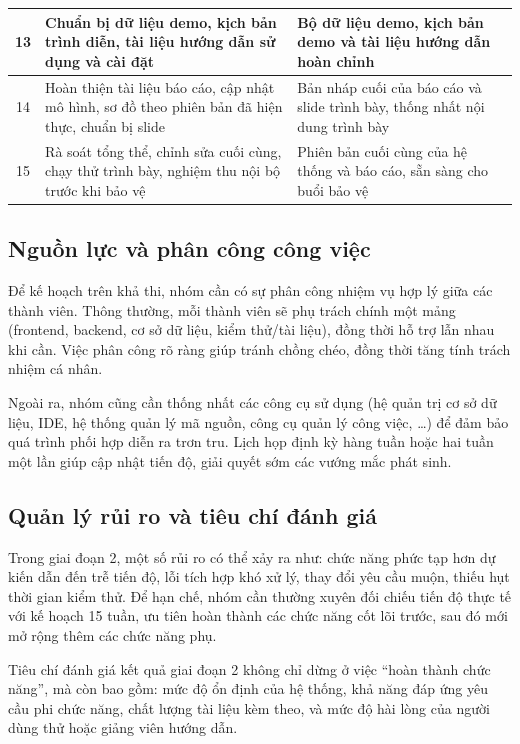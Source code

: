 \begin{center}
\begin{longtable}{|c|p{5cm}|p{4cm}|p{3cm}|}
    \hline
    13 & Chuẩn bị dữ liệu demo, kịch bản trình diễn, tài liệu hướng dẫn sử dụng và cài đặt & Bộ dữ liệu demo, kịch bản demo và tài liệu hướng dẫn hoàn chỉnh & \\
    \hline
    14 & Hoàn thiện tài liệu báo cáo, cập nhật mô hình, sơ đồ theo phiên bản đã hiện thực, chuẩn bị slide & Bản nháp cuối của báo cáo và slide trình bày, thống nhất nội dung trình bày & \\
    \hline
    15 & Rà soát tổng thể, chỉnh sửa cuối cùng, chạy thử trình bày, nghiệm thu nội bộ trước khi bảo vệ & Phiên bản cuối cùng của hệ thống và báo cáo, sẵn sàng cho buổi bảo vệ & \\
    \hline
\end{longtable}
\end{center}

\subsection{Nguồn lực và phân công công việc}

Để kế hoạch trên khả thi, nhóm cần có sự phân công nhiệm vụ hợp lý giữa các thành viên. Thông thường, mỗi thành viên sẽ phụ trách chính một mảng (frontend, backend, cơ sở dữ liệu, kiểm thử/tài liệu), đồng thời hỗ trợ lẫn nhau khi cần. Việc phân công rõ ràng giúp tránh chồng chéo, đồng thời tăng tính trách nhiệm cá nhân.

Ngoài ra, nhóm cũng cần thống nhất các công cụ sử dụng (hệ quản trị cơ sở dữ liệu, IDE, hệ thống quản lý mã nguồn, công cụ quản lý công việc, \ldots) để đảm bảo quá trình phối hợp diễn ra trơn tru. Lịch họp định kỳ hàng tuần hoặc hai tuần một lần giúp cập nhật tiến độ, giải quyết sớm các vướng mắc phát sinh.

\subsection{Quản lý rủi ro và tiêu chí đánh giá}

Trong giai đoạn 2, một số rủi ro có thể xảy ra như: chức năng phức tạp hơn dự kiến dẫn đến trễ tiến độ, lỗi tích hợp khó xử lý, thay đổi yêu cầu muộn, thiếu hụt thời gian kiểm thử. Để hạn chế, nhóm cần thường xuyên đối chiếu tiến độ thực tế với kế hoạch 15 tuần, ưu tiên hoàn thành các chức năng cốt lõi trước, sau đó mới mở rộng thêm các chức năng phụ.

Tiêu chí đánh giá kết quả giai đoạn 2 không chỉ dừng ở việc “hoàn thành chức năng”, mà còn bao gồm: mức độ ổn định của hệ thống, khả năng đáp ứng yêu cầu phi chức năng, chất lượng tài liệu kèm theo, và mức độ hài lòng của người dùng thử hoặc giảng viên hướng dẫn.


